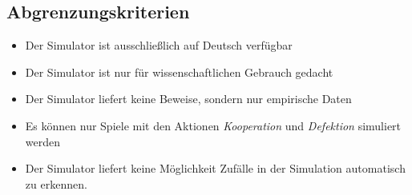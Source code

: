 \subsection{Abgrenzungskriterien}
\begin{itemize}
\item Der Simulator ist ausschließlich auf Deutsch verfügbar
\item Der Simulator ist nur für wissenschaftlichen Gebrauch gedacht
\item Der Simulator liefert keine Beweise, sondern nur empirische Daten
\item Es können nur Spiele mit den Aktionen \emph{Kooperation} und \emph{Defektion} simuliert werden
\item Der Simulator liefert keine Möglichkeit Zufälle in der Simulation automatisch zu erkennen.
\end{itemize}